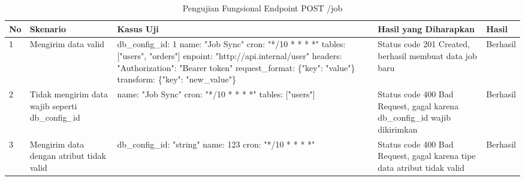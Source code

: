 \begin{table}[H]
    \centering
    \begin{tabular}{|p{0.5cm}|p{3cm}|p{5cm}|p{5cm}|p{1.5cm}|}
        \hline
        \rowcolor[HTML]{DAE8FC} 
        \textbf{No} & \textbf{Skenario} & \textbf{Kasus Uji} & \textbf{Hasil yang Diharapkan} & \textbf{Hasil} \\ \hline
        1 & Mengirim data valid & 
        db\_config\_id: 1 \newline name: "Job Sync" \newline cron: "*/10 * * * *" \newline tables: ["users", "orders"] \newline enpoint: "http://api.internal/user" \newline headers: {"Authorization": "Bearer token"} \newline request\_format: \{"key": "value"\} \newline transform: \{"key": "new\_value"\} & 
        Status code 201 Created, berhasil membuat data job baru & 
        Berhasil \\ \hline
        2 & Tidak mengirim data wajib seperti db\_config\_id & 
        name: "Job Sync" \newline cron: "*/10 * * * *" \newline tables: ["users"] & 
        Status code 400 Bad Request, gagal karena db\_config\_id wajib dikirimkan & 
        Berhasil \\ \hline
        3 & Mengirim data dengan atribut tidak valid & 
        db\_config\_id: "string" \newline name: 123 \newline cron: "*/10 * * * *" & 
        Status code 400 Bad Request, gagal karena tipe data atribut tidak valid & 
        Berhasil \\ \hline
    \end{tabular}
    \caption{Pengujian Fungsional Endpoint POST /job}
    \label{tab:job_post_testing}
\end{table}
